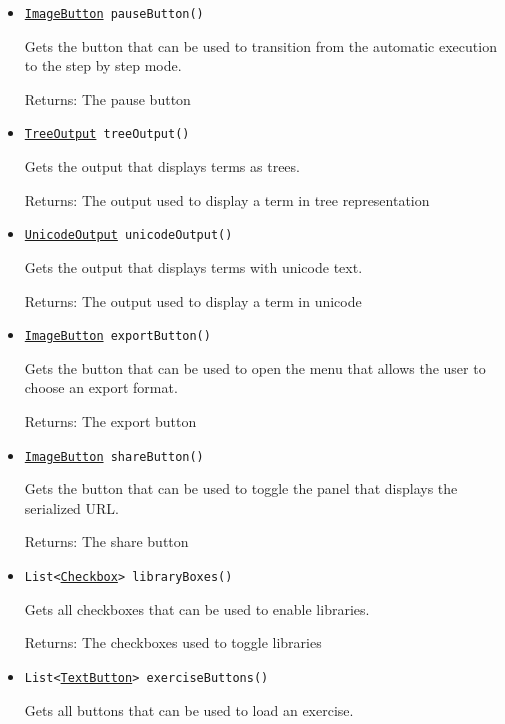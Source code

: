 \begin{itemize}
\item \texttt{\hyperref[type:edu.kit.wavelength.client.view.webui.component.ImageButton]{ImageButton} pauseButton()}

Gets the button that can be used to transition from the automatic execution to the step by step mode.

Returns: The pause button

\item \texttt{\hyperref[type:edu.kit.wavelength.client.view.webui.component.TreeOutput]{TreeOutput} treeOutput()}

Gets the output that displays terms as trees.

Returns: The output used to display a term in tree representation

\item \texttt{\hyperref[type:edu.kit.wavelength.client.view.webui.component.UnicodeOutput]{UnicodeOutput} unicodeOutput()}

Gets the output that displays terms with unicode text.

Returns: The output used to display a term in unicode

\item \texttt{\hyperref[type:edu.kit.wavelength.client.view.webui.component.ImageButton]{ImageButton} exportButton()}

Gets the button that can be used to open the menu that allows the user to choose an export format.

Returns: The export button

\item \texttt{\hyperref[type:edu.kit.wavelength.client.view.webui.component.ImageButton]{ImageButton} shareButton()}

Gets the button that can be used to toggle the panel that displays the serialized URL.

Returns: The share button

\item \texttt{List<\hyperref[type:edu.kit.wavelength.client.view.webui.component.Checkbox]{Checkbox}> libraryBoxes()}

Gets all checkboxes that can be used to enable libraries.

Returns: The checkboxes used to toggle libraries

\item \texttt{List<\hyperref[type:edu.kit.wavelength.client.view.webui.component.TextButton]{TextButton}> exerciseButtons()}

Gets all buttons that can be used to load an exercise.


\end{itemize}
